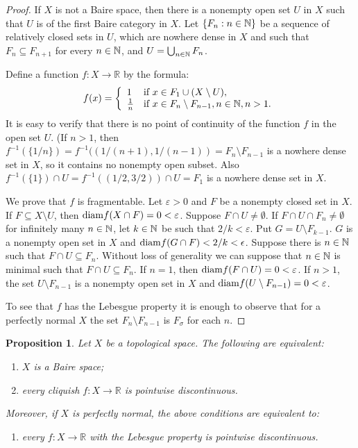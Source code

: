 \documentclass[a4paper]{amsart}
\theoremstyle{plain}
\newtheorem{proposition}[theorem]{Proposition}
\theoremstyle{definition}
\theoremstyle{remark}
\numberwithin{equation}{section}
\begin{document}
 \begin{proof} If $X$ is not a Baire space, then there is a nonempty open set $U$ in $X$ such that $U$ is of the first Baire category in $X$. Let $\{F_n: n \in \Bbb N\}$ be a sequence of relatively closed sets in $U$, which are nowhere dense in $X$ and such that $F_n \subseteq F_{n+1}$ for every $n \in \Bbb N$, and  $U = \bigcup_{n \in \Bbb N} F_n$.
 	
    Define a function $f\colon X\to\mathbb{R}$ by the formula:
      $$f(x)=\left\{\begin{array}{ll}
        1 & \textup{if\ }x \in F_1  \cup (X \setminus U),\\
        \frac{1}{n} & \textup{if\ }x\in F_n  \setminus F_{n-1}, n\in\mathbb{N}, n>1.
        \end{array}\right.$$
    It is easy to verify that there is  no point of continuity of the function $f$ in the open set $U$. (If $n > 1$, then $f^{-1}(\{1/n\}) = f^{-1}((1/(n+1),1/(n-1)) = F_n  \setminus F_{n-1}$ is a nowhere dense set in $X$, so it contains no nonempty open subset. Also $f^{-1}(\{1\}) \cap U = f^{-1}((1/2,3/2)) \cap U = F_1$ is a nowhere dense set in $X$.
 	
 	
    We prove that $f$ is fragmentable. 
    Let $\varepsilon > 0$ and  $F$ be a nonempty closed set in $X$. If $F \subseteq X \setminus U$, then 
    ${\rm diam}f(X \cap F) = 0 < \varepsilon$.
    Suppose $F \cap U \ne \emptyset$. If $F \cap U \cap F_n \ne \emptyset$ for infinitely many $n \in \Bbb N$, 
    let $k \in \Bbb N$ be such that $2/k < \varepsilon$. 
    Put  $G =  U \setminus F_{k-1}$. 
    $G$ is a nonempty  open set in $X$ and 
    ${\rm diam}f(G \cap F) < 2/k < \epsilon$.
    Suppose there is $n \in \Bbb N$ such that  $F \cap U \subseteq F_n$. 
    Without loss of generality we can suppose that $n \in \Bbb N$ is minimal such that $F \cap U \subseteq F_n$. 
    If $n = 1$, then ${\rm diam}f(F \cap U) = 0  < \varepsilon$. 
    If $n > 1$,  the set $U \setminus F_{n-1}$ is a nonempty  open set in $X$ and ${\rm diam}f(U \setminus F_{n-1}) = 0 < \varepsilon$.

    To see that $f$ has the Lebesgue property it is enough to observe that for a perfectly normal $X$ the set $F_n\setminus F_{n-1}$ is $F_\sigma$ for each $n$.
 \end{proof}

  \begin{proposition}\label{prop:baire-frag} 
    Let $X$ be a topological space. The following are equivalent:
 	\begin{enumerate}
 		\item  $X$ is a Baire space;\label{prop:baire-cliq:1}
 		\item every cliquish $f\colon X \to \mathbb R$ is pointwise discontinuous.\label{prop:baire-cliq:2}
 	\end{enumerate}
    Moreover, if $X$ is perfectly normal, the above conditions are equivalent to:
 	\begin{enumerate}[start=3]
        \item every $f\colon X \to \mathbb R$ with the Lebesgue property is pointwise discontinuous.\label{prop:baire-cliq:3}
 	\end{enumerate}
  \end{proposition}
\end{document}
